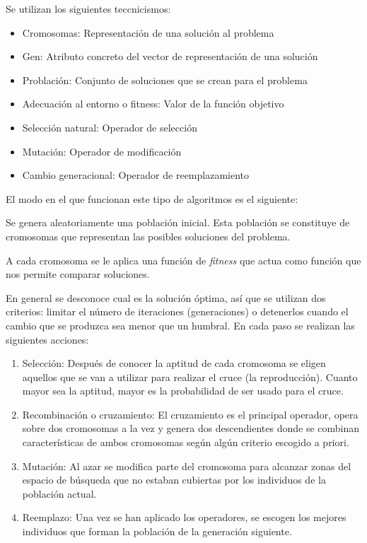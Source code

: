\documentclass[12pt]{article}
\begin{document}
Se utilizan los siguientes teccnicismos:

\begin{itemize}
\item Cromosomas: Representación de una solución al problema
\item Gen: Atributo concreto del vector de representación de una solución
\item Problación: Conjunto de soluciones que se crean para el problema
\item Adecuación al entorno o fitness: Valor de la función objetivo
\item Selección natural: Operador de selección
\item Mutación: Operador de modificación
\item Cambio generacional: Operador de reemplazamiento
\end{itemize}

El modo en el que funcionan este tipo de algoritmos es el siguiente:

Se genera aleatoriamente una población inicial. Esta población se
constituye de cromosomas que representan las posibles soluciones del
problema.

A cada cromosoma se le aplica una función de \textit{fitness} que
actua como función que nos permite comparar soluciones.

En general se desconoce cual es la solución óptima, así que se
utilizan dos criterios: limitar el número de iteraciones
(generaciones) o detenerlos cuando el cambio que se produzca sea menor
que un humbral. En cada paso se realizan las siguientes acciones:

\begin{enumerate}
\item Selección: Después de conocer la aptitud de cada cromosoma se
  eligen aquellos que se van a utilizar para realizar el cruce (la
  reproducción). Cuanto mayor sea la aptitud, mayor es la probabilidad
  de ser usado para el cruce.

\item Recombinación o cruzamiento: El cruzamiento es el principal
  operador, opera sobre dos cromosomas a la vez y genera dos
  descendientes donde se combinan características de ambos cromosomas
  según algún criterio escogido a priori.

\item Mutación: Al azar se modifica parte del cromosoma para alcanzar
  zonas del espacio de búsqueda que no estaban cubiertas por los
  individuos de la población actual.

\item Reemplazo: Una vez se han aplicado los operadores, se escogen
  los mejores individuos que forman la población de la generación
  siguiente.
\end{enumerate}
\end{document}
